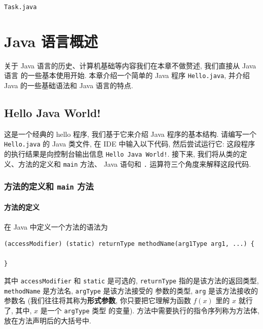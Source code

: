 \documentclass[10pt,UTF8]{book} %
\begin{document}
\begin{code}
    \lstinline|Task.java|
    
\end{code}
\chapter{Java 语言概述}

\quad\quad 关于 Java 语言的历史、计算机基础等内容我们在本章不做赘述, 我们直接从 Java 语言
的一些基本使用开始. 本章介绍一个简单的 Java 程序 \lstinline|Hello.java|, 并介绍 Java
的一些基础语法和 Java 语言的特点.

\section{Hello Java World!}


\begin{example}
    \label{helloJavaWorld}
    这是一个经典的 hello 程序, 我们基于它来介绍 Java 程序的基本结构. 请编写一个
    \lstinline|Hello.java| 的 Java 类文件, 在 IDE 中输入以下代码, 然后尝试运行它:
    这段程序的执行结果是向控制台输出信息 \lstinline|Hello Java World!|.
    接下来, 我们将从类的定义、方法的定义和 \lstinline|main| 方法、
    Java 语句和 \lstinline|.| 运算符三个角度来解释这段代码.
\end{example}



\subsection{方法的定义和 \lstinline|main| 方法}

\subsubsection{方法的定义}

在 Java 中定义一个方法的语法为
\begin{lstlisting}
(accessModifier) (static) returnType methodName(arg1Type arg1, ...) {

}
\end{lstlisting}
其中 \lstinline|accessModifier| 和 \lstinline|static| 是可选的, 
\lstinline|returnType| 指的是该方法的返回类型, 
\lstinline|methodName| 是方法名,
\lstinline|argType| 是该方法接受的
参数的类型, \lstinline|arg| 是该方法接收的参数名 (我们往往将其称为\textbf{形式参数}, 
你只要把它理解为函数 $f(x)$ 里的 $x$ 就行了, 其中, $x$ 是一个 \lstinline|argType| 类型
的变量). 方法中需要执行的指令序列称为方法体, 放在方法声明后的大括号中.
\end{document}
